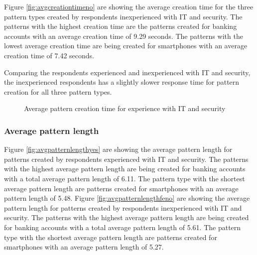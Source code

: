     Figure \ref{fig:avgcreationtimeno} are showing the average creation time for the three pattern types created by respondents inexperienced with IT and security. The patterns with the highest creation time are the patterns created for banking accounts with an average creation time of 9.29 seconds. The patterns with the lowest average creation time are being created for smartphones with an average creation time of 7.42 seconds.

    Comparing the respondents experienced and inexperienced with IT and security, the inexperienced respondents has a slightly slower response time for pattern creation for all three pattern types. 

      \begin{figure}[H]
        \centering
        \caption{Average pattern creation time for experience with IT and security}
        \label{fig:avgcreationtimeexperience}
      \end{figure}

    \clearpage
    \subsubsection{Average pattern length}
    Figure \ref{fig:avgpatternlengthyes} are showing the average pattern length for patterns created by respondents experienced with IT and security. The patterns with the highest average pattern length are being created for banking accounts with a total average pattern length of 6.11. The pattern type with the shortest average pattern length are patterns created for smartphones with an average pattern length of 5.48. Figure \ref{fig:avgpatternlengthfeno} are showing the average pattern length for patterns created by respondents inexperienced with IT and security. The patterns with the highest average pattern length are being created for banking accounts with a total average pattern length of 5.61. The pattern type with the shortest average pattern length are patterns created for smartphones with an average pattern length of 5.27. 

